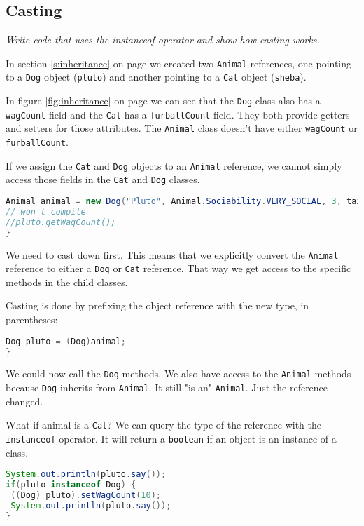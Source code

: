 \subsection{Casting}
\textit{Write code that uses the instanceof operator and show how casting works.}

In section \ref{s:inheritance} on page \pageref{s:inheritance} we created two \texttt{Animal} references, one pointing to a \texttt{Dog} object (\texttt{pluto}) and another pointing to a \texttt{Cat} object (\texttt{sheba}).

In figure \ref{fig:inheritance} on page \pageref{fig:inheritance} we can see that the \texttt{Dog} class also has a \texttt{wagCount} field and the \texttt{Cat} has a \texttt{furballCount} field. They both provide getters and setters for those attributes. The \texttt{Animal} class doesn't have either \texttt{wagCount} or \texttt{furballCount}.

If we assign the \texttt{Cat} and \texttt{Dog} objects to an \texttt{Animal} reference, we cannot simply access those fields in the \texttt{Cat} and \texttt{Dog} classes. 

\begin{lstlisting}[language=Java]
Animal animal = new Dog("Pluto", Animal.Sociability.VERY_SOCIAL, 3, tail);
// won't compile
//pluto.getWagCount();
}
\end{lstlisting}

We need to cast down first. This means that we explicitly convert the \texttt{Animal} reference to either a \texttt{Dog} or \texttt{Cat} reference. That way we get access to the specific methods in the child classes.

Casting is done by prefixing the object reference with the new type, in parentheses: 

\begin{lstlisting}[language=Java]
Dog pluto = (Dog)animal;
}
\end{lstlisting}

We could now call the \texttt{Dog} methods. We also have access to the \texttt{Animal} methods because \texttt{Dog} inherits from \texttt{Animal}. It still "is-an" \texttt{Animal}. Just the reference changed.

What if animal is a \texttt{Cat}? We can query the type of the reference with the \texttt{instanceof} operator. It will return a \texttt{boolean} if an object is an instance of a class.

\begin{lstlisting}[language=Java]
System.out.println(pluto.say());
if(pluto instanceof Dog) {
 ((Dog) pluto).setWagCount(10);
 System.out.println(pluto.say());
}
\end{lstlisting}

